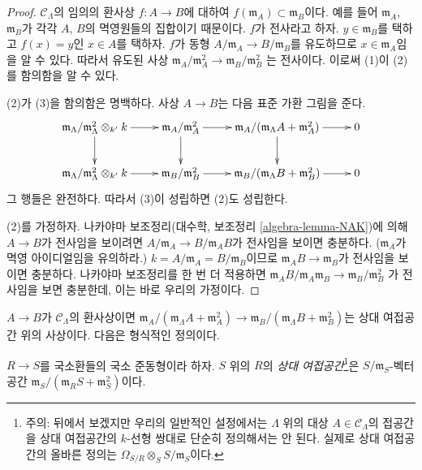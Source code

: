 \begin{proof}
$\mathcal{C}_\Lambda$의 임의의 환사상 $f : A \to B$에 대하여
$f(\mathfrak m_A) \subset \mathfrak m_B$이다. 예를 들어
$\mathfrak m_A$, $\mathfrak m_B$가 각각 $A$, $B$의 멱영원들의 집합이기
때문이다. $f$가 전사라고 하자. $y \in \mathfrak m_B$를 택하고
$f(x) = y$인 $x \in A$를 택하자. $f$가 동형
$A/\mathfrak m_A \to B/\mathfrak m_B$를 유도하므로
$x \in \mathfrak m_A$임을 알 수 있다. 따라서 유도된 사상
$\mathfrak m_A/\mathfrak m_A^2 \to \mathfrak m_B/\mathfrak m_B^2$
는 전사이다. 이로써 (1)이 (2)를 함의함을 알 수 있다.

\medskip\noindent
(2)가 (3)을 함의함은 명백하다. 사상 $A \to B$는 다음 표준 가환 그림을
준다.
$$
\xymatrix{
\mathfrak m_\Lambda/\mathfrak m_\Lambda^2 \otimes_{k'} k \ar[r] \ar[d] &
\mathfrak m_A/\mathfrak m_A^2 \ar[r] \ar[d] &
\mathfrak m_A/(\mathfrak m_\Lambda A + \mathfrak m_A^2) \ar[r] \ar[d] & 0 \\
\mathfrak m_\Lambda/\mathfrak m_\Lambda^2 \otimes_{k'} k \ar[r] &
\mathfrak m_B/\mathfrak m_B^2 \ar[r] &
\mathfrak m_B/(\mathfrak m_\Lambda B + \mathfrak m_B^2) \ar[r] & 0
}
$$
그 행들은 완전하다. 따라서 (3)이 성립하면 (2)도 성립한다.

\medskip\noindent
(2)를 가정하자. 나카야마 보조정리(대수학, 보조정리
\ref{algebra-lemma-NAK})에 의해 $A \to B$가 전사임을 보이려면
$A/\mathfrak m_A \to B/\mathfrak m_AB$가 전사임을 보이면 충분하다.
($\mathfrak m_A$가 멱영 아이디얼임을 유의하라.)
$k = A/\mathfrak m_A = B/\mathfrak m_B$이므로
$\mathfrak m_AB \to \mathfrak m_B$가 전사임을 보이면 충분하다.
나카야마 보조정리를 한 번 더 적용하면
$\mathfrak m_AB/\mathfrak m_A\mathfrak m_B \to \mathfrak m_B/\mathfrak m_B^2$
가 전사임을 보면 충분한데, 이는 바로 우리의 가정이다.
\end{proof}

\noindent
$A \to B$가 $\mathcal{C}_\Lambda$의 환사상이면
$\mathfrak m_A/(\mathfrak m_\Lambda A + \mathfrak m_A^2)
\to \mathfrak m_B/(\mathfrak m_\Lambda B + \mathfrak m_B^2)$는
상대 여접공간 위의 사상이다. 다음은 형식적인 정의이다.

\begin{definition}
\label{definition-tangent-space-ring}
$R \to S$를 국소환들의 국소 준동형이라 하자.
$S$ 위의 $R$의 {\it 상대 여접공간}\footnote{주의: 뒤에서 보겠지만 우리의
일반적인 설정에서는 $\Lambda$ 위의 대상
$A \in \mathcal{C}_\Lambda$의 접공간을 상대 여접공간의 $k$-선형 쌍대로
단순히 정의해서는 안 된다. 실제로 상대 여접공간의 올바른 정의는
$\Omega_{S/R} \otimes_S S/\mathfrak m_S$이다.}은
$S/\mathfrak m_S$-벡터 공간
$\mathfrak m_S/(\mathfrak m_R S + \mathfrak m_S^2)$이다.
\end{definition}

